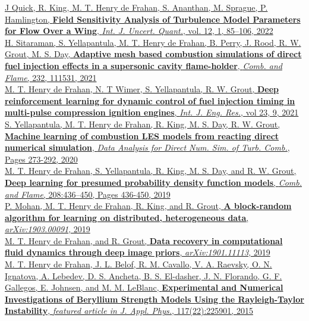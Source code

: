 \documentclass[11pt,letterpaper]{article}
\begin{document}
\href{https://doi.org/10.1615/Int.J.UncertaintyQuantification.2021036467 }{J Quick, R. King, M. T. Henry de Frahan, S. Ananthan, M. Sprague, P. Hamlington, \textbf{Field Sensitivity Analysis of Turbulence Model Parameters for Flow Over a Wing}, \textit{Int. J. Uncert. Quant.}, vol. 12, 1, 85--106, 2022}\\[2ex]
\href{https://doi.org/10.1016/j.combustflame.2021.111531}{H. Sitaraman, S. Yellapantula, M. T. Henry de Frahan, B. Perry, J. Rood, R. W. Grout, M. S. Day, \textbf{Adaptive mesh based combustion simulations of direct fuel injection effects in a supersonic cavity flame-holder}, \textit{Comb. and Flame}, 232, 111531, 2021}\\[2ex]
\href{https://doi.org/10.1177/14680874211019345}{M. T. Henry de Frahan, N. T Wimer, S. Yellapantula, R. W. Grout, \textbf{Deep reinforcement learning for dynamic control of fuel injection timing in multi-pulse compression ignition engines}, \textit{Int. J. Eng. Res.}, vol 23, 9, 2021}\\[2ex]
\href{https://link.springer.com/chapter/10.1007/978-3-030-44718-2_14}{S. Yellapantula, M. T. Henry de Frahan, R. King, M. S. Day, R. W. Grout, \textbf{Machine learning of combustion LES models from reacting direct numerical simulation}, \textit{Data Analysis for Direct Num. Sim. of Turb. Comb.}, Pages 273-292, 2020}\\[2ex]
\href{https://doi.org/10.1016/j.combustflame.2019.07.015}{M. T. Henry de Frahan, S. Yellapantula, R. King, M. S. Day, and R. W. Grout, \textbf{Deep learning for presumed probability density function models}, \textit{Comb. and Flame}, 208:436--450, Pages 436-450, 2019}\\[2ex]%
\href{http://arxiv.org/abs/1903.00091}{P. Mohan, M. T. Henry de Frahan, R. King, and R. Grout, \textbf{A block-random algorithm for learning on distributed, heterogeneous data}, \textit{arXiv:1903.00091}, 2019}\\[2ex]%
\href{http://arxiv.org/abs/1901.11113}{M. T. Henry de Frahan, and R. Grout, \textbf{Data recovery in computational fluid dynamics through deep image priors}, \textit{arXiv:1901.11113}, 2019}\\[2ex]%
\href{http://dx.doi.org/10.1063/1.4922336}{M. T. Henry de Frahan, J. L. Belof, R. M. Cavallo, V. A. Raevsky, O. N. Ignatova, A. Lebedev, D. S. Ancheta, B. S. El-dasher, J. N. Florando, G. F. Gallegos, E. Johnsen, and M. M. LeBlanc, \textbf{Experimental and Numerical Investigations of Beryllium Strength Models Using the Rayleigh-Taylor Instability}, \textit{featured article in J. Appl. Phys.}, 117(22):225901, 2015}\\[2ex]%
\end{document}
